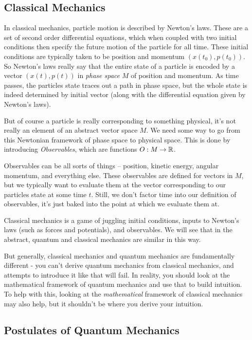 \documentclass[a4paper]{article}
\begin{document}
\subsection{Classical Mechanics}

In classical mechanics, particle motion is described by Newton's laws. These are a set of second order differential equations, which when coupled with two initial conditions then specify the future motion of the particle for all time. These initial conditions are typically taken to be position and momentum $(x(t_0), p(t_0)).$ So Newton's laws really say that the entire state of a particle is encoded by a vector $(x(t), p(t))$ in \emph{phase space} $M$ of position and momentum. As time passes, the particles state traces out a path in phase space, but the whole state is indeed determined by initial vector (along with the differential equation given by Newton's laws).

But of course a particle is really corresponding to something physical, it's not really an element of an abstract vector space $M$. We need some way to go from this Newtonian framework of phase space to physical space. This is done by introducing \emph{Observables}, which are functions $O: M \rightarrow \mathbb{R}$.

Observables can be all sorts of things -- position, kinetic energy, angular momentum, and everything else. These observables are defined for vectors in $M$, but we typically want to evaluate them at the vector corresponding to our particles state at some time $t$. Still, we don't factor time into our definition of observables, it's just baked into the point at which we evaluate them at.

Classical mechanics is a game of juggling initial conditions, inputs to Newton's laws (such as forces and potentials), and observables. We will see that in the abstract, quantum and classical mechanics are similar in this way.

But generally, classical mechanics and quantum mechanics are fundamentally different - you can't derive quantum mechanics from classical mechanics, and attempts to introduce it like that will fail. In reality, you should look at the mathematical framework of quantum mechanics and use that to build intuition. To help with this, looking at the \emph{mathematical} framework of classical mechanics may also help, but it shouldn't be where you derive your intuition.

\subsection{Postulates of Quantum Mechanics}
\end{document}
